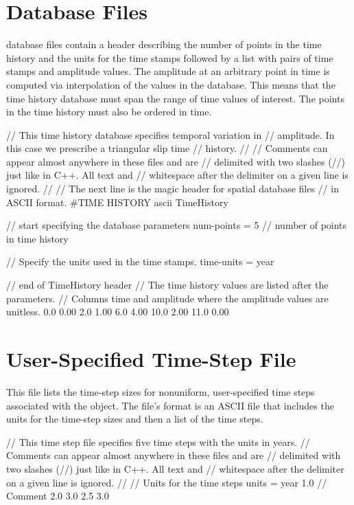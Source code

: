 \section{ Database Files}
\label{sec:format:TimeHistoryIO}

 database files contain a header describing the
number of points in the time history and the units for the time stamps
followed by a list with pairs of time stamps and amplitude values. The
amplitude at an arbitrary point in time is computed via interpolation
of the values in the database. This means that the time history
database must span the range of time values of interest. The points in
the time history must also be ordered in time.
\begin{TimeHistoryIO}
// This time history database specifies temporal variation in
// amplitude. In this case we prescribe a triangular slip time
// history. 
//
// Comments can appear almost anywhere in these files and are
// delimited with two slashes (//) just like in C++. All text and 
// whitespace after the delimiter on a given line is ignored.
//
// The next line is the magic header for spatial database files 
// in ASCII format.
#TIME HISTORY ascii
TimeHistory { // start specifying the database parameters
  num-points = 5 // number of points in time history

  // Specify the units used in the time stamps.
  time-units = year
} // end of TimeHistory header
// The time history values are listed after the parameters.
// Columns time and amplitude where the amplitude values are unitless.
 0.0     0.00
 2.0     1.00
 6.0     4.00
10.0     2.00
11.0     0.00
\end{TimeHistoryIO}


\section{User-Specified Time-Step File}
\label{sec:format:TimeStepUser}

This file lists the time-step sizes for nonuniform, user-specified
time steps associated with the  object. The
file's format is an ASCII file that includes the units for the
time-step sizes and then a list of the time steps.
\begin{TimeStepUser}
// This time step file specifies five time steps with the units in years.
// Comments can appear almost anywhere in these files and are
// delimited with two slashes (//) just like in C++. All text and 
// whitespace after the delimiter on a given line is ignored.
//
// Units for the time steps
units = year
1.0 // Comment
2.0
3.0
2.5
3.0
\end{TimeStepUser}

